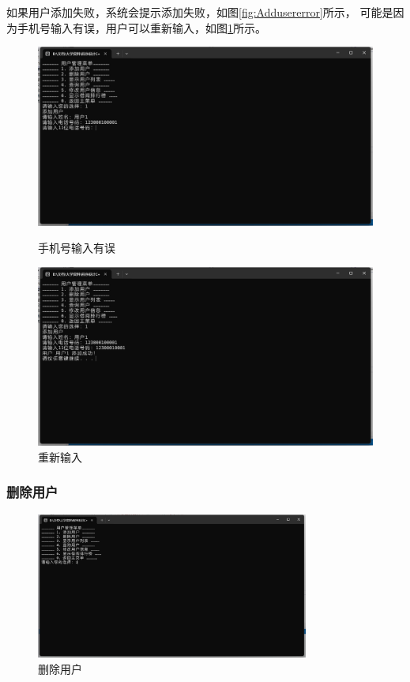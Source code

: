 \documentclass[12pt,twoside]{ctexart}
\begin{document}
如果用户添加失败，系统会提示添加失败，如图\ref{fig:Addusererror}所示，
可能是因为手机号输入有误，用户可以重新输入，如图\ref{fig:Adduseragain}所示。
\begin{figure}[H]
    \begin{minipage}[c]{0.48\textwidth}
        \centering
        \includegraphics[width=\textwidth]{Addusererror.png}
        \caption{手机号输入有误}
        \label{fig:Addusererror}
    \end{minipage}
    \hfill
    \begin{minipage}[c]{0.48\textwidth}
        \centering
        \includegraphics[width=\textwidth]{Adduseragain.png}
        \caption{重新输入}
        \label{fig:Adduseragain}
    \end{minipage}
\end{figure}

\subsubsection{删除用户}
\begin{figure}[H]
    \centering
    \includegraphics[width=0.8\textwidth]{Delete.png}
    \caption{删除用户}
\end{figure}
\end{document}
